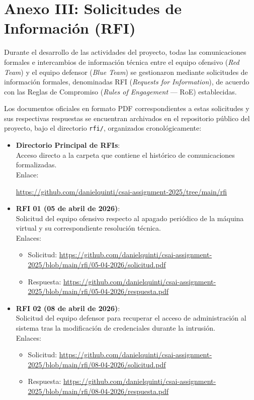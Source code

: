 \chapter[Anexo III: Solicitudes de Información (RFI)]{Anexo III: Solicitudes de Información (RFI)}
\label{chap:anexo_rfi}

Durante el desarrollo de las actividades del proyecto, todas las comunicaciones formales e intercambios de información técnica entre el equipo ofensivo (\textit{Red Team}) y el equipo defensor (\textit{Blue Team}) se gestionaron mediante solicitudes de información formales, denominadas RFI (\textit{Requests for Information}), de acuerdo con las Reglas de Compromiso (\textit{Rules of Engagement} --- RoE) establecidas.

Los documentos oficiales en formato PDF correspondientes a estas solicitudes y sus respectivas respuestas se encuentran archivados en el repositorio público del proyecto, bajo el directorio \texttt{rfi/}, organizados cronológicamente:

\begin{itemize}
    \item \textbf{Directorio Principal de RFIs}: \\
    Acceso directo a la carpeta que contiene el histórico de comunicaciones formalizadas. \\
    Enlace:
    \begin{center}
        \scriptsize\url{https://github.com/danielquinti/csai-assignment-2025/tree/main/rfi}
    \end{center}
    
    \item \textbf{RFI 01 (05 de abril de 2026)}: \\
    Solicitud del equipo ofensivo respecto al apagado periódico de la máquina virtual y su correspondiente resolución técnica. \\
    Enlaces:
    \begin{itemize}
        \item Solicitud: \scriptsize\url{https://github.com/danielquinti/csai-assignment-2025/blob/main/rfi/05-04-2026/solicitud.pdf}
        \item Respuesta: \scriptsize\url{https://github.com/danielquinti/csai-assignment-2025/blob/main/rfi/05-04-2026/respuesta.pdf}
    \end{itemize}
    
    \item \textbf{RFI 02 (08 de abril de 2026)}: \\
    Solicitud del equipo defensor para recuperar el acceso de administración al sistema tras la modificación de credenciales durante la intrusión. \\
    Enlaces:
    \begin{itemize}
        \item Solicitud: \scriptsize\url{https://github.com/danielquinti/csai-assignment-2025/blob/main/rfi/08-04-2026/solicitud.pdf}
        \item Respuesta: \scriptsize\url{https://github.com/danielquinti/csai-assignment-2025/blob/main/rfi/08-04-2026/respuesta.pdf}
    \end{itemize}
\end{itemize}
